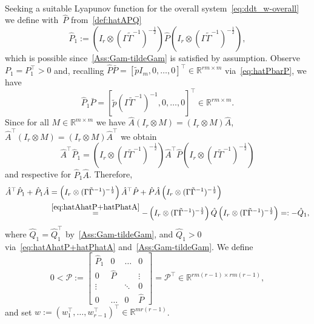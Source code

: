 \documentclass[ envcountsect, envcountsame]{svjour3}
\newcommand{\R}{\mathbb{R}}
\newcommand{\cP}{\mathcal{P}}
\begin{document}
\ \\
Seeking a suitable Lyapunov function for the overall system~\eqref{eq:ddt_w-overall} we define
with~$ \hat P$ from~\eqref{def:hatAPQ} 
\begin{equation*}
\hat P_1 := \left(I_r \otimes (\Gamma \tilde \Gamma^{-1})^{-\frac{1}{2}}  \right) \hat P \left(I_r \otimes (\Gamma \tilde \Gamma^{-1})^{-\frac{1}{2}}  \right),
\end{equation*}
which is possible since~\ref{Ass:Gam-tildeGam} is satisfied by assumption. 
Observe $P_1 = P_1^\top > 0$ and, recalling $\hat P \bar P = [\tilde p I_m,0,\ldots,0]^\top \in \R^{rm \times m}$ via~\eqref{eq:hatPbarP}, 
we have 
\begin{equation} \label{eq:P1-barP}
\hat P_1  \bar P = [\tilde p (\Gamma \tilde \Gamma^{-1})^{-1},0,\ldots,0]^\top \in \R^{rm \times m}.
\end{equation}
Since for all $M \in \R^{m \times m}$ we have $\hat A (I_r \otimes M) = (I_r \otimes M) \hat A$,
$\hat A^\top (I_r \otimes M) = (I_r \otimes M) \hat A^\top $ 
we obtain
\[
\hat A^\top \hat P_1 = \left(I_r \otimes (\Gamma \tilde \Gamma^{-1})^{-\frac{1}{2}}  \right) \hat A^\top \hat P \left(I_r \otimes (\Gamma \tilde \Gamma^{-1})^{-\frac{1}{2}}\right)
\]
and respective for $\hat P_1 \hat A$. Therefore, 
\begin{equation} \label{eq:AP1-P1A-Q1}
\begin{aligned}
\hat A^\top \hat P_1 + \hat P_1 \hat A &= \left(I_r \otimes (\Gamma \tilde \Gamma^{-1})^{-\frac{1}{2}}  \right) \hat A^\top \hat P + \hat P \hat A \left(I_r \otimes (\Gamma \tilde \Gamma^{-1})^{-\frac{1}{2}}\right)  \\
&\overset{\eqref{eq:hatAhatP+hatPhatA}}{ =} - \left(I_r \otimes (\Gamma \tilde \Gamma^{-1})^{-\frac{1}{2}}  \right) \hat Q \left(I_r \otimes (\Gamma \tilde \Gamma^{-1})^{-\frac{1}{2}}\right) 
 =: - \hat Q_1,
\end{aligned}
\end{equation}
where $\hat Q_1 = \hat Q_1^\top$ by~\ref{Ass:Gam-tildeGam}, and $\hat Q_1 > 0$ via~\eqref{eq:hatAhatP+hatPhatA} 
and~\ref{Ass:Gam-tildeGam}.
%
We define
\begin{equation*}
0 < \cP := \begin{bmatrix} \hat P_1 & 0  &  \ldots & 0 \\
0 & \hat P &  &  \vdots \\
\vdots & & \ddots & 0 \\
0 & \ldots & 0 &\hat P \end{bmatrix} = \cP^\top \in \R^{rm(r-1) \times rm(r-1)},
\end{equation*}
and set $w := (w_1^\top,\ldots,w_{r-1}^\top)^\top \in \R^{m r(r-1)}$.
\end{document}
